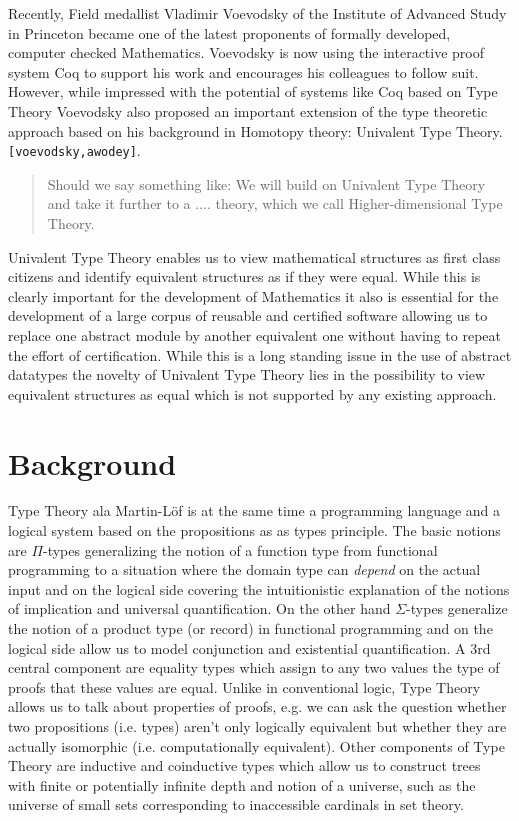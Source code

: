 \documentclass[a4paper]{article}
\renewcommand{\cite}[1]{{\tt[#1]}}
\begin{document}
Recently, Field medallist Vladimir Voevodsky of the Institute of
Advanced Study in Princeton became one of the latest proponents of
formally developed, computer checked Mathematics. Voevodsky is now
using the interactive proof system Coq to support his work and
encourages his colleagues to follow suit. However, while impressed
with the potential of systems like Coq based on Type Theory Voevodsky
also proposed an important extension of the type theoretic approach
based on his background in Homotopy theory: Univalent Type Theory.
\cite{voevodsky,awodey}. 
\begin{quote}{\footnotesize
Should we say something like: We will build on Univalent Type Theory and take it
further to a .... theory, which we call Higher-dimensional Type
Theory.}
\end{quote}
Univalent Type Theory enables us to view mathematical structures as
first class citizens and identify equivalent structures as if they
were equal. While this is clearly important for the development of
Mathematics it also is essential for the development of a large corpus
of reusable and certified software allowing us to replace one abstract
module by another equivalent one without having to repeat the effort
of certification. While this is a long standing issue in the use of
abstract datatypes the novelty of Univalent Type Theory lies in the
possibility to view equivalent structures as equal which is not
supported by any existing approach.


\section{Background}

Type Theory ala Martin-L\"of is at the same time a programming
language and a logical system based on the propositions as as types
principle. The basic notions are $\Pi$-types generalizing the notion
of a function type from functional programming to a situation where
the domain type can \emph{depend} on the actual input and on the
logical side covering the intuitionistic  explanation of the notions of 
implication and universal quantification. On the other hand
$\Sigma$-types generalize the notion of a product type (or record) in
functional programming and on the logical side allow us to model
conjunction and existential quantification. A 3rd central component are
equality types which assign to any two values the type of proofs that 
these values are equal. Unlike in conventional logic, Type Theory
allows us to talk about properties of proofs, e.g. we can ask the
question whether two propositions (i.e. types) aren't only logically
equivalent but whether they are actually isomorphic
(i.e. computationally equivalent). Other components of Type Theory are
inductive and coinductive types which allow us to construct trees
with finite or potentially infinite depth and notion of a universe,
such as the universe of small sets corresponding to inaccessible
cardinals in set theory.
\end{document}
